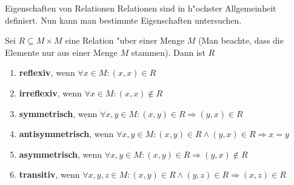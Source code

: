 \documentclass{beamer}
\begin{document}
\begin{frame}{Eigenschaften von Relationen}
Relationen sind in h"ochster Allgemeinheit definiert. Nun kann man bestimmte Eigenschaften untersuchen.
\begin{definition}
Sei $R\subseteq M\times M$ eine Relation "uber einer Menge $M$ (Man beachte, dass die Elemente nur aus einer Menge $M$ stammen). Dann ist $R$
\begin{enumerate}
\item \textbf{reflexiv}, wenn $\forall x\in M: (x,x)\in R$
\item \textbf{irreflexiv}, wenn $\forall x\in M: (x,x)\notin R$
\item \textbf{symmetrisch}, wenn $\forall x,y\in M: (x,y)\in R\Rightarrow (y,x)\in R$
\item \textbf{antisymmetrisch}, wenn $\forall x,y\in M: (x,y)\in R\wedge (y,x)\in R\Rightarrow x=y$
\item \textbf{asymmetrisch}, wenn $\forall x,y\in M: (x,y)\in R\Rightarrow (y,x)\notin R$
\item \textbf{transitiv}, wenn $\forall x,y,z\in M: (x,y)\in R\wedge (y,z)\in R\Rightarrow (x,z)\in R$
\end{enumerate}
\end{definition}
\end{frame}


\end{document}
